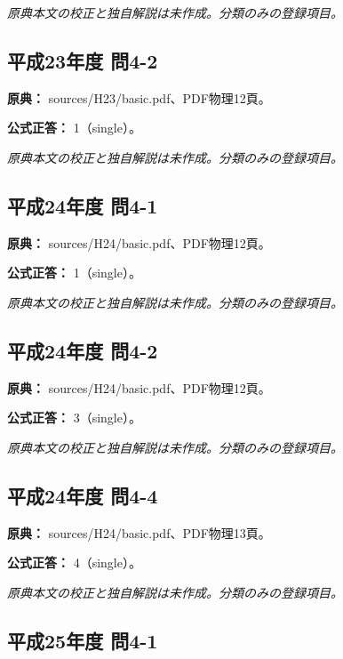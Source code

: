 \par\textit{原典本文の校正と独自解説は未作成。分類のみの登録項目。}

\subsection{平成23年度 問4-2}
\label{q:h23-reg-basic-4-2}

\noindent\textbf{原典：} sources/H23/basic.pdf、PDF物理12頁。

\textbf{公式正答：} 1（single）。

\par\textit{原典本文の校正と独自解説は未作成。分類のみの登録項目。}

\subsection{平成24年度 問4-1}
\label{q:h24-reg-basic-4-1}

\noindent\textbf{原典：} sources/H24/basic.pdf、PDF物理12頁。

\textbf{公式正答：} 1（single）。

\par\textit{原典本文の校正と独自解説は未作成。分類のみの登録項目。}

\subsection{平成24年度 問4-2}
\label{q:h24-reg-basic-4-2}

\noindent\textbf{原典：} sources/H24/basic.pdf、PDF物理12頁。

\textbf{公式正答：} 3（single）。

\par\textit{原典本文の校正と独自解説は未作成。分類のみの登録項目。}

\subsection{平成24年度 問4-4}
\label{q:h24-reg-basic-4-4}

\noindent\textbf{原典：} sources/H24/basic.pdf、PDF物理13頁。

\textbf{公式正答：} 4（single）。

\par\textit{原典本文の校正と独自解説は未作成。分類のみの登録項目。}

\subsection{平成25年度 問4-1}
\label{q:h25-reg-basic-4-1}

